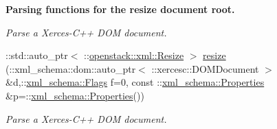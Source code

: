 \begin{Indent}{\bf Parsing functions for the resize document root.}
\begin{DoxyCompactItemize}
\begin{DoxyCompactList}\small\item\em Parse a Xerces-\/C++ DOM document. \item\end{DoxyCompactList}\item 
::std::auto\_\-ptr$<$ ::\hyperlink{classopenstack_1_1xml_1_1Resize}{openstack::xml::Resize} $>$ \hyperlink{namespaceopenstack_1_1xml_a2d56d1150f9d900127dc881f3acaf4c6}{resize} (::xml\_\-schema::dom::auto\_\-ptr$<$ ::xercesc::DOMDocument $>$ \&d,::\hyperlink{namespacexml__schema_affb4c227cbd9aa7453dd1dc5a1401943}{xml\_\-schema::Flags} f=0, const ::\hyperlink{namespacexml__schema_ad27ce19a7ee1d3b1064092648898f64c}{xml\_\-schema::Properties} \&p=::\hyperlink{namespacexml__schema_ad27ce19a7ee1d3b1064092648898f64c}{xml\_\-schema::Properties}())
\begin{DoxyCompactList}\small\item\em Parse a Xerces-\/C++ DOM document. \item\end{DoxyCompactList}\end{DoxyCompactItemize}
\end{Indent}
